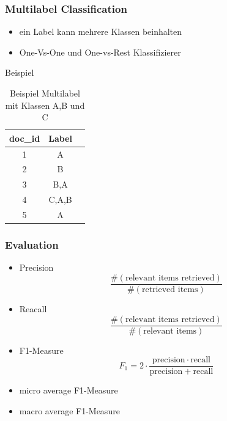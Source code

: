 \documentclass[12pt, xcolor=table]{beamer}
\begin{document}
\begin{frame}
    \frametitle{Multilabel Classification}
    \begin{itemize}
        \item ein Label kann mehrere Klassen beinhalten
        \item One-Vs-One und One-vs-Rest Klassifizierer
    \end{itemize}
    \begin{block}{Beispiel}
    \begin{center}
    \begin{table}
        \begin{tabular}{ccc}
            \tiny\textbf{doc\_id} &\tiny \textbf{Label}  \\
            \hline
            \tiny 1 &\tiny A  \\
            \tiny 2 &\tiny B  \\
            \tiny 3 &\tiny B,A  \\
            \tiny 4 &\tiny C,A,B  \\
            \tiny 5 &\tiny A  \\
        \end{tabular}
         \caption*{Beispiel Multilabel mit Klassen A,B und C}
    \end{table}
    \end{center}
    \end{block}
\end{frame}

\begin{frame}
    \frametitle{Evaluation}
    \begin{itemize}
        \item Precision \[\frac{\#(\text{relevant items retrieved})}{\#(\text{retrieved items})}\]
        \item Reacall \[\frac{\#(\text{relevant items retrieved})}{\#(\text{relevant items})}\]
        \item F1-Measure \[F_1 = 2 \cdot \frac{\mathrm{precision} \cdot \mathrm{recall}}{\mathrm{precision} + \mathrm{recall}}\]
        \item micro average F1-Measure
        \item macro average F1-Measure
    \end{itemize}
\end{frame}
\end{document}
